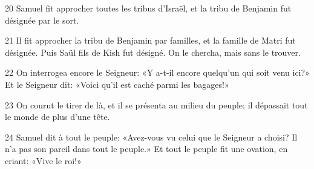 
20 Samuel fit approcher toutes les tribus d’Israël, et la tribu de Benjamin fut désignée par le sort.

21 Il fit approcher la tribu de Benjamin par familles, et la famille de Matri fut désignée. Puis Saül fils de Kish fut désigné. On le chercha, mais sans le trouver.

22 On interrogea encore le Seigneur: «Y a-t-il encore quelqu’un qui soit venu ici?» Et le Seigneur dit: «Voici qu’il est caché parmi les bagages!»

23 On courut le tirer de là, et il se présenta au milieu du peuple; il dépassait tout le monde de plus d’une tête.

24 Samuel dit à tout le peuple: «Avez-vous vu celui que le Seigneur a choisi? Il n’a pas son pareil dans tout le peuple.» Et tout le peuple fit une ovation, en criant: «Vive le roi!»
